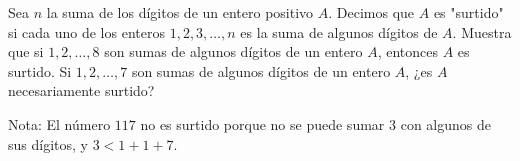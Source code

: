 Sea $n$ la suma de los dígitos de un entero positivo $A$. Decimos que $A$ es "surtido" si cada uno de los enteros $1,2,3,\dots ,n$ es la suma de algunos dígitos de $A$. Muestra que si $1,2,\dots ,8$ son sumas de algunos dígitos de un entero $A$, entonces $A$ es surtido. Si $1,2,\dots ,7$ son sumas de algunos dígitos de un entero $A$, ¿es $A$ necesariamente surtido?

Nota: El número $117$ no es surtido porque no se puede sumar $3$ con algunos de sus dígitos, y $3<1+1+7$.